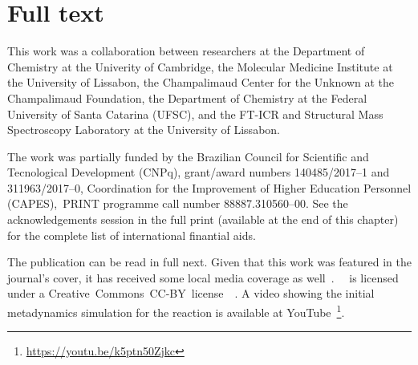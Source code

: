 \section{Full text}

This work was a collaboration between researchers
at the Department of Chemistry at the Univerity of Cambridge,
the Molecular Medicine Institute at the University of Lissabon,
the Champalimaud Center for the Unknown at the Champalimaud Foundation,
the Department of Chemistry at the Federal University of Santa Catarina (UFSC),
and the FT-ICR and Structural Mass Spectroscopy Laboratory at the University of Lissabon.

The work was partially funded by the Brazilian Council for Scientific and Tecnological Development (CNPq),
grant/award numbers 140485/2017--1 and 311963/2017--0,
Coordination for the Improvement of Higher Education Personnel (CAPES),~PRINT programme call number 88887.310560--00.
See the acknowledgements session in the full print
(available at the end of this chapter)
for the complete list of international finantial aids.

The publication can be read in full next.
Given that this work was featured in the journal's cover,
it has received some local media coverage as well~\cite{noticias-da-ufsc2020}.~\citeauthor{Oliveira_2020}~\cite{Oliveira_2020}
is licensed under a
Creative~Commons~CC-BY~license~\ccby~\cite{ACS_CCBY_2014}.
A video showing the initial metadynamics simulation for the reaction is available at YouTube~\footnote{\url{https://youtu.be/k5ptn50Zjkc}}.


